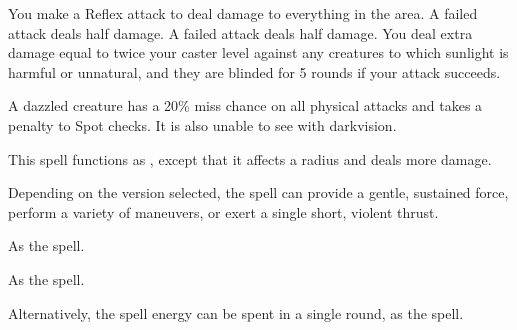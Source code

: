 \begin{spelleffect}
    You make a Reflex attack to deal damage to everything in the area. A failed attack deals half damage. A failed attack deals half damage. You deal extra damage equal to twice your caster level against any creatures to which sunlight is harmful or unnatural, and they are blinded for 5 rounds if your attack succeeds.
\end{spelleffect}
\begin{spellnotes}
    A dazzled creature has a 20\% miss chance on all physical attacks and takes a  penalty to Spot checks. It is also unable to see with darkvision. 
\end{spellnotes}

\begin{spelleffect}
    This spell functions as , except that it affects a \areamed radius and deals more damage.
\end{spelleffect}

\begin{comment}
\subsubsection{T}
\end{comment}

\begin{spelleffect}
    Depending on the version selected, the spell can provide a gentle, sustained force, perform a variety of maneuvers, or exert a single short, violent thrust.
    \par {} As the  spell.

    \par {} As the  spell.

    \par {} Alternatively, the spell energy can be spent in a single round, as the  spell.
\end{spelleffect}

